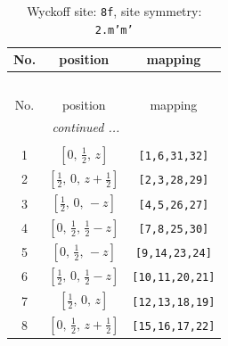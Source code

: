 \documentclass[fleqn,8pt]{jsarticle}
\begin{document}
\begin{longtable}{ccc}
\caption{Wyckoff site: {\tt 8f}, site symmetry: {\tt 2.m'm'}}
 \\
 \hline \hline
No. & position & mapping \\ \hline \endfirsthead

\multicolumn{2}{l}{\tablename\ \thetable{}} \\
 \hline \hline
No. & position & mapping \\ \hline \endhead

 \hline \hline
\multicolumn{2}{r}{\footnotesize\it continued ...} \\ \endfoot

 \hline \hline
\multicolumn{2}{r}{} \\ \endlastfoot

1 & $\left[ 0,\, \frac{1}{2},\, z \right]$ & {\tt [1,6,31,32]} \\ \hline
2 & $\left[ \frac{1}{2},\, 0,\, z + \frac{1}{2} \right]$ & {\tt [2,3,28,29]} \\ \hline
3 & $\left[ \frac{1}{2},\, 0,\, - z \right]$ & {\tt [4,5,26,27]} \\ \hline
4 & $\left[ 0,\, \frac{1}{2},\, \frac{1}{2} - z \right]$ & {\tt [7,8,25,30]} \\ \hline
5 & $\left[ 0,\, \frac{1}{2},\, - z \right]$ & {\tt [9,14,23,24]} \\ \hline
6 & $\left[ \frac{1}{2},\, 0,\, \frac{1}{2} - z \right]$ & {\tt [10,11,20,21]} \\ \hline
7 & $\left[ \frac{1}{2},\, 0,\, z \right]$ & {\tt [12,13,18,19]} \\ \hline
8 & $\left[ 0,\, \frac{1}{2},\, z + \frac{1}{2} \right]$ & {\tt [15,16,17,22]} \\
\end{longtable}
\renewcommand{\arraystretch}{1.2}
\end{document}

